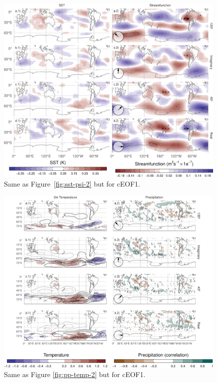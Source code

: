 \documentclass[smallextended]{svjour3}       %
\begin{document}
\begin{figure}
\includegraphics{../figures/sst-psi-1-1} \caption{Same as Figure~\ref{fig:sst-psi-2} but for cEOF1.}\label{fig:sst-psi-1}
\end{figure}



\begin{figure}
\centering
\includegraphics{../figures/pp-temp-1-1.pdf}
\caption{\label{fig:pp-temp-1}Same as Figure \ref{fig:pp-temp-2} but for cEOF1.}
\end{figure}
\end{document}
